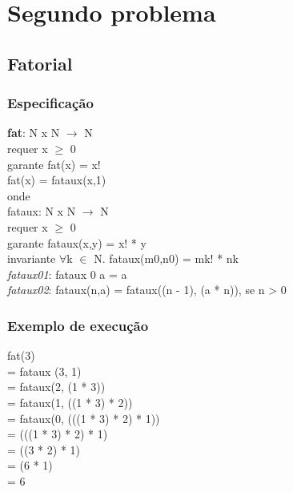 \documentclass{article}
\begin{document}
\section{Segundo problema}

\subsection{Fatorial}

\subsubsection{Especificação}
\textbf{fat}: N x N $\rightarrow$ N
\\requer x $\ge$ 0
\\garante fat(x) = x!
\\fat(x) = fataux(x,1)
\\onde
\\fataux: N x N $\rightarrow$ N
\\requer x $\ge$ 0
\\garante fataux(x,y) = x! * y
\\invariante $\forall$k $\in$ N. fataux(m0,n0) = mk! * nk
\\\textit{fataux01}: fataux 0 a = a
\\\textit{fataux02}: fataux(n,a) = fataux((n - 1), (a * n)), se n > 0

\subsubsection{Exemplo de execução}
fat(3)
\\= fataux (3, 1)
\\= fataux(2, (1 * 3))
\\= fataux(1, ((1 * 3) * 2))
\\= fataux(0, (((1 * 3) * 2) * 1))
\\= (((1 * 3) * 2) * 1)
\\= ((3 * 2) * 1)
\\= (6 * 1)
\\= 6
\end{document}
